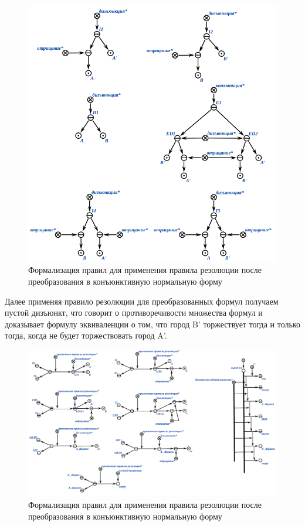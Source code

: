 \begin{figure}[H]
	\includegraphics[scale=0.8]{author/part3/figures/resolution_prepared_formulas_example.png}
	\caption{Формализация правил для применения правила резолюции после преобразования в конъюнктивную нормальную форму}
	\label{fig:resolution_formulas}
\end{figure}

Далее применяя правило резолюции для преобразованных формул получаем пустой дизъюнкт, что говорит о противоречивости множества формул и доказывает формулу эквиваленции о том, что город B' торжествует тогда и только тогда, когда не будет торжествовать город A'.

\begin{figure}[H]
	\includegraphics[scale=0.7]{author/part3/figures/resolution_inference.png}
	\caption{Формализация правил для применения правила резолюции после преобразования в конъюнктивную нормальную форму}
	\label{fig:resolution_inference}
\end{figure}

